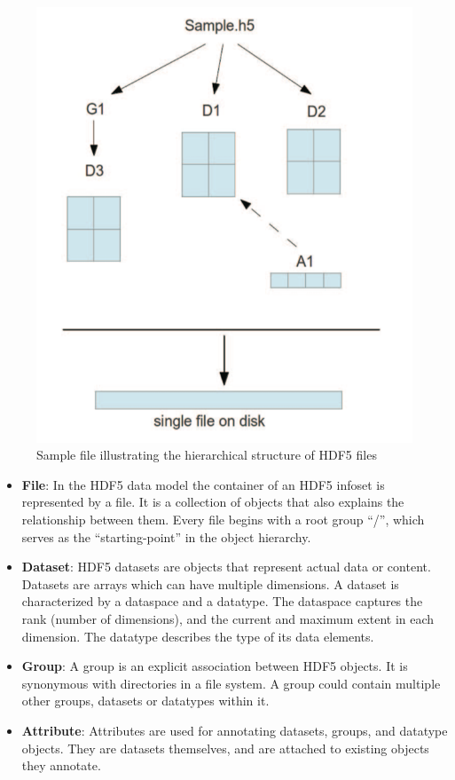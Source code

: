 \documentclass[conference]{IEEEtran}
\begin{document}
\begin{figure}[htbp]
\centering
\includegraphics[scale=0.30]{images/hdf5.png}
\caption{Sample file illustrating the hierarchical structure of HDF5 files}
\label{fig:hdf5-sample}
\end{figure}

\begin{itemize}

\item
  \textbf{File}: In the HDF5 data model the container of an HDF5 infoset
  is represented by a file. It is a collection of objects that also
  explains the relationship between them. Every file begins with a root
  group ``/'', which serves as the ``starting-point'' in the object
  hierarchy.

\item
  \textbf{Dataset}: HDF5 datasets are objects that represent actual data
  or content. Datasets are arrays which can have multiple dimensions. A
  dataset is characterized by a dataspace and a datatype. The dataspace
  captures the rank (number of dimensions), and the current and maximum
  extent in each dimension. The datatype describes the type of its data
  elements.

\item
  \textbf{Group}: A group is an explicit association between HDF5
  objects. It is synonymous with directories in a file system. A group
  could contain multiple other groups, datasets or datatypes within it.

\item
  \textbf{Attribute}: Attributes are used for annotating datasets,
  groups, and datatype objects. They are datasets themselves, and are
  attached to existing objects they annotate.

\end{itemize}
\end{document}
